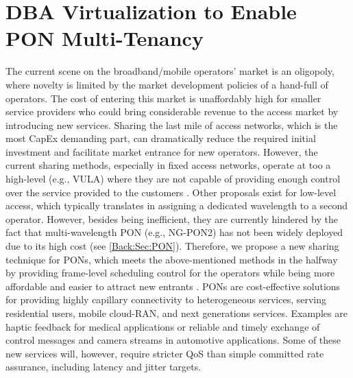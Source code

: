 \acresetall
\chapter*{DBA Virtualization to Enable PON Multi-Tenancy}

The current scene on the broadband/mobile operators' market is an oligopoly, where novelty is limited by the market development policies of a hand-full of operators. The cost of entering this market is unaffordably high for smaller service providers who could bring considerable revenue to the access market by introducing new services. Sharing the last mile of access networks, which is the most \ac{CapEx} demanding part, can dramatically reduce the required initial investment and facilitate market entrance for new operators. However, the current sharing methods, especially in fixed access networks, operate at too a high-level (e.g., \ac{VULA}) where they are not capable of providing enough control over the service provided to the customers \cite{7592399}. Other proposals exist for low-level access, which typically translates in assigning a dedicated wavelength to a second operator. However, besides being inefficient, they are currently hindered by the fact that multi-wavelength \ac{PON} (e.g., \ac{NG-PON2}) has not been widely deployed due to its high cost (see \autoref{Back:Sec:PON}). Therefore, we propose a new sharing technique for \acp{PON}, which meets the above-mentioned methods in the halfway by providing frame-level scheduling control for the operators while being more affordable and easier to attract new entrants \cite{7936877}.
 \acp{PON} are cost-effective solutions for providing highly capillary connectivity to heterogeneous services, serving residential users, mobile cloud-RAN, and next generations services. Examples are haptic feedback for medical applications or reliable and timely exchange of control messages and camera streams in automotive applications. Some of these new services will, however, require stricter \ac{QoS} than simple committed rate assurance, including latency and jitter targets. 

